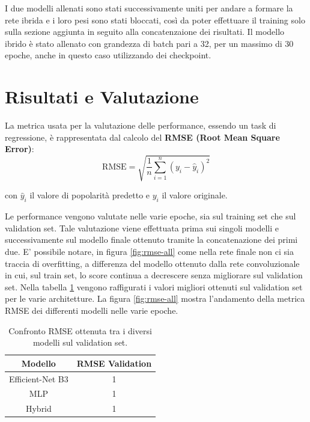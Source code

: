     I due modelli allenati sono stati successivamente uniti per andare a formare la rete ibrida e i loro pesi sono stati bloccati, così da poter effettuare il training 
    solo sulla sezione aggiunta in seguito alla concatenzaione dei risultati.
    Il modello ibrido è stato allenato con grandezza di batch pari a 32, per un massimo di 30 epoche, anche in questo caso utilizzando dei checkpoint.


\section{Risultati e Valutazione}

La metrica usata per la valutazione delle performance, essendo un task di regressione, è rappresentata dal calcolo del \textbf{RMSE (Root Mean Square Error)}:
\begin{equation}
    \textrm{RMSE} = \sqrt{\frac{1}{n} \sum_{i=1}^{n} (y_i - \hat{y}_i)^2} 
\end{equation}

con $\hat{y}_i$ il valore di popolarità predetto e $y_i$ il valore originale.


Le performance vengono valutate nelle varie epoche, sia sul training set che sul validation set. Tale valutazione viene effettuata prima sui singoli modelli e successivamente sul modello finale ottenuto tramite la concatenazione dei primi due. E' possibile notare, in figura \ref{fig:rmse-all} come nella rete finale non ci sia traccia di overfitting, a differenza del modello ottenuto dalla rete convoluzionale in cui, sul train set, lo score continua a decrescere senza migliorare sul validation set. 
Nella tabella \ref{table:rmse} vengono raffigurati i valori migliori ottenuti sul validation set per le varie architetture. La figura \ref{fig:rmse-all} mostra l'andamento della metrica RMSE dei differenti modelli nelle varie epoche.

\begin{table}[h]
\caption{Confronto RMSE ottenuta tra i diversi modelli sul validation set.}
  \vspace{3mm}
\centering
\begin{tabular}{|c|c|}
\hline
\textbf{Modello}   & \textbf{RMSE Validation} \\ \hline \hline
Efficient-Net B3      & 1               \\ \hline
MLP       & 1               \\ \hline
Hybrid & 1               \\ \hline
\end{tabular}
\label{table:rmse}
\end{table}

